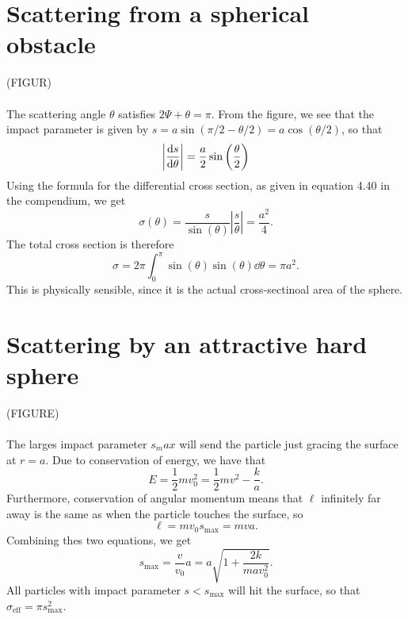 \documentclass{article}
\begin{document}
    \section{Scattering from a spherical obstacle}
        (FIGUR) \\ \\
        The scattering angle $\theta$ satisfies $2 \Psi + \theta = \pi$. From the figure, we see that the impact parameter is given by $s = a \sin(\pi/2 - \theta /2 ) = a \cos(\theta / 2)$, so that 
        \begin{equation*}
            \left| \dv{s}{\theta} \right| = \frac{a}{2} \sin\left(\frac{\theta}{2}\right)
        \end{equation*}
        Using the formula for the differential cross section, as given in equation 4.40 in the compendium, we get
        \begin{equation*}
            \sigma(\theta) = \frac{s}{\sin(\theta)} \left| \frac{s}{\theta} \right| = \frac{a^2}{4}.
        \end{equation*}
        The total cross section is therefore
        \begin{equation*}
            \sigma = 2 \pi \int_0^{\pi} \sin(\theta) \sin(\theta) \dd \theta = \pi a^2.
        \end{equation*}
        This is physically sensible, since it is the actual cross-sectinoal area of the sphere.



    \section{Scattering by an attractive hard sphere}
        (FIGURE) \\ \\
        The larges impact parameter $s_max$ will send the particle just gracing the surface at $r=a$. Due to conservation of energy, we have that 
        \begin{equation*}
            E = \frac{1}{2} m v_0^2 = \frac{1}{2}mv^2 - \frac{k}{a}.
        \end{equation*}
        Furthermore, conservation of angular momentum means that $\ell$ infinitely far away is the same as when the particle touches the surface, so
        \begin{equation*}
            \ell = m v_0 s_\mathrm{max} = mva.
        \end{equation*}
        Combining thes two equations, we get
        \begin{equation*}
            s_\mathrm{max} = \frac{v}{v_0}a = a \sqrt{1 + \frac{2 k}{m a v_0^2}}.
        \end{equation*}
        All particles with impact parameter $s < s_\mathrm{max}$ will hit the surface, so that $\sigma_\mathrm{eff} = \pi s_\mathrm{max}^2$.
\end{document}
